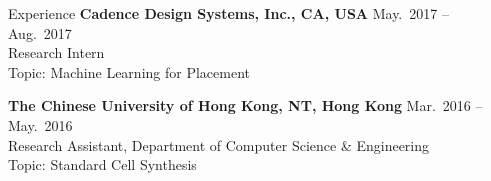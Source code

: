 
\begin{rSection}{Experience}
{\bf Cadence Design Systems, Inc., CA, USA}               \hfill { May.~2017 -- Aug.~2017} \\
Research Intern \\
Topic: Machine Learning for Placement

{\bf The Chinese University of Hong Kong, NT, Hong Kong}  \hfill { Mar.~2016 -- May.~2016} \\ 
Research Assistant, Department of Computer Science \& Engineering \\
Topic: Standard Cell Synthesis




\end{rSection}


